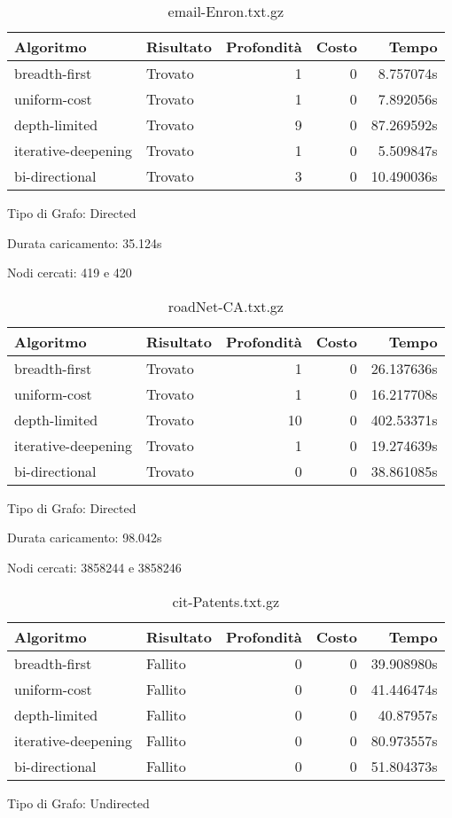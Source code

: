 \begin{table}[h]
\centering
\begin{tabular}{|l|l|r|r|r|}
\hline
\textbf{Algoritmo} & \textbf{Risultato} & \textbf{Profondità} & \textbf{Costo} & \textbf{Tempo} \\
 \hline
breadth-first & Trovato & 1 & 0 & 8.757074s \\
uniform-cost & Trovato & 1 & 0 & 7.892056s \\
depth-limited & Trovato & 9 & 0 & 87.269592s \\
iterative-deepening & Trovato & 1 & 0 & 5.509847s \\
bi-directional & Trovato & 3 & 0 & 10.490036s \\
\hline
\end{tabular}
\caption{email-Enron.txt.gz}
\end{table}
Tipo di Grafo: Directed

Durata caricamento: 35.124s

Nodi cercati: 419 e 420

\begin{table}[h]
\centering
\begin{tabular}{|l|l|r|r|r|}
\hline
\textbf{Algoritmo} & \textbf{Risultato} & \textbf{Profondità} & \textbf{Costo} & \textbf{Tempo} \\
 \hline
breadth-first & Trovato & 1 & 0 & 26.137636s \\
uniform-cost & Trovato & 1 & 0 & 16.217708s \\
depth-limited & Trovato & 10 & 0 & 402.53371s \\
iterative-deepening & Trovato & 1 & 0 & 19.274639s \\
bi-directional & Trovato & 0 & 0 & 38.861085s \\
\hline
\end{tabular}
\caption{roadNet-CA.txt.gz}
\end{table}
Tipo di Grafo: Directed

Durata caricamento: 98.042s

Nodi cercati: 3858244 e 3858246

\begin{table}[h]
\centering
\begin{tabular}{|l|l|r|r|r|}
\hline
\textbf{Algoritmo} & \textbf{Risultato} & \textbf{Profondità} & \textbf{Costo} & \textbf{Tempo} \\
 \hline
breadth-first & Fallito & 0 & 0 & 39.908980s \\
uniform-cost & Fallito & 0 & 0 & 41.446474s \\
depth-limited & Fallito & 0 & 0 & 40.87957s \\
iterative-deepening & Fallito & 0 & 0 & 80.973557s \\
bi-directional & Fallito & 0 & 0 & 51.804373s \\
\hline
\end{tabular}
\caption{cit-Patents.txt.gz}
\end{table}
Tipo di Grafo: Undirected


